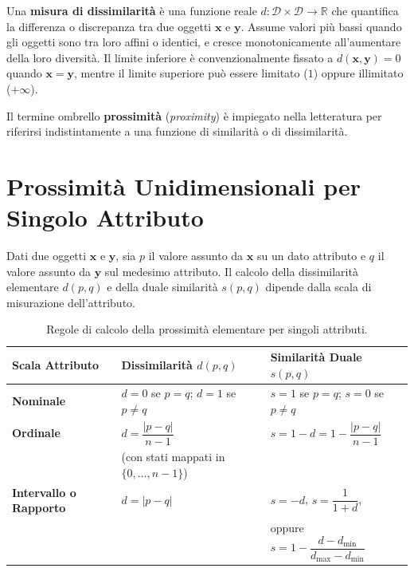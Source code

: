 \begin{definition}
Una \textbf{misura di dissimilarità} è una funzione reale $d: \mathcal{D} \times \mathcal{D} \to \mathbb{R}$ che quantifica la differenza o discrepanza tra due oggetti $\mathbf{x}$ e $\mathbf{y}$. Assume valori più bassi quando gli oggetti sono tra loro affini o identici, e cresce monotonicamente all'aumentare della loro diversità. Il limite inferiore è convenzionalmente fissato a $d(\mathbf{x}, \mathbf{y}) = 0$ quando $\mathbf{x} = \mathbf{y}$, mentre il limite superiore può essere limitato ($1$) oppure illimitato ($+\infty$).
\end{definition}

Il termine ombrello \textbf{prossimità} (\textit{proximity}) è impiegato nella letteratura per riferirsi indistintamente a una funzione di similarità o di dissimilarità.

\FloatBarrier
\section{Prossimità Unidimensionali per Singolo Attributo}
\label{sec:dm-single-attribute-proximity}

Dati due oggetti $\mathbf{x}$ e $\mathbf{y}$, sia $p$ il valore assunto da $\mathbf{x}$ su un dato attributo e $q$ il valore assunto da $\mathbf{y}$ sul medesimo attributo. Il calcolo della dissimilarità elementare $d(p, q)$ e della duale similarità $s(p, q)$ dipende dalla scala di misurazione dell'attributo.

\begin{table}[H]
\centering
\small
\begin{tabularx}{\textwidth}{lYY}
\toprule
\textbf{Scala Attributo} & \textbf{Dissimilarità $d(p, q)$} & \textbf{Similarità Duale $s(p, q)$} \\
\midrule
\textbf{Nominale} & $d = 0$ se $p = q$; \quad $d = 1$ se $p \neq q$ & $s = 1$ se $p = q$; \quad $s = 0$ se $p \neq q$ \\
\addlinespace
\textbf{Ordinale} & $d = \dfrac{|p - q|}{n - 1}$ & $s = 1 - d = 1 - \dfrac{|p - q|}{n - 1}$ \\
& {\scriptsize (con stati mappati in $\{0, \dots, n-1\}$)} & \\
\addlinespace
\textbf{Intervallo o Rapporto} & $d = |p - q|$ & $s = -d$, \quad $s = \dfrac{1}{1 + d}$, \\
& & oppure $s = 1 - \dfrac{d - d_{\min}}{d_{\max} - d_{\min}}$ \\
\bottomrule
\end{tabularx}
\caption{Regole di calcolo della prossimità elementare per singoli attributi.}
\label{tab:dm-single-attribute-proximity}
\end{table}

